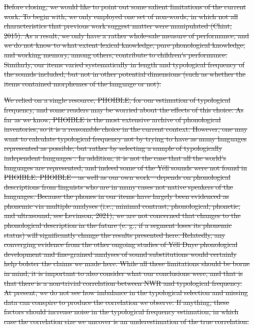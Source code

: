 \documentclass[english,,man,floatsintext]{apa6} %
\providecommand{\DIFdeltex}[1]{{\protect\color{red}\sout{#1}}}                      %
\providecommand{\DIFdelbegin}{} %
\providecommand{\DIFdel}[1]{\texorpdfstring{\DIFdeltex{#1}}{}} %
\newcommand{\DIFscaledelfig}{0.5}
\newlength{\DIFdelgraphicswidth} %
\newlength{\DIFdelgraphicsheight} %
\newcommand{\DIFdelincludegraphics}[2][]{%
	\sbox{\DIFdelgraphicsbox}{\DIFOincludegraphics[#1]{#2}}%
	\settoboxwidth{\DIFdelgraphicswidth}{\DIFdelgraphicsbox} %
	\settoboxtotalheight{\DIFdelgraphicsheight}{\DIFdelgraphicsbox} %
	\scalebox{\DIFscaledelfig}{%
		\parbox[b]{\DIFdelgraphicswidth}{\usebox{\DIFdelgraphicsbox}\\[-\baselineskip] \rule{\DIFdelgraphicswidth}{0em}}\llap{\resizebox{\DIFdelgraphicswidth}{\DIFdelgraphicsheight}{%
				\setlength{\unitlength}{\DIFdelgraphicswidth}%
				\begin{picture}(1,1)%
				\thicklines\linethickness{2pt} %
				{\color[rgb]{1,0,0}\put(0,0){\framebox(1,1){}}}%
				{\color[rgb]{1,0,0}\put(0,0){\line( 1,1){1}}}%
				{\color[rgb]{1,0,0}\put(0,1){\line(1,-1){1}}}%
				\end{picture}%
			}\hspace*{3pt}}} %
} %
\DeclareRobustCommand{\DIFdelbegin}{\DIFOdelbegin \let\includegraphics\DIFdelincludegraphics} %
\begin{document}
\DIFdelbegin %

\DIFdel{Before closing, we would like to point out some salient limitations of the current work. To begin with, we only employed one set of non-words, in which not all characteristics that previous work suggest matter were manipulated (Chiat, 2015). As a result, we only have a rather whole-sale measure of performance, and we do not know to what extent lexical knowledge, pure phonological knowledge, and working memory, among others, contribute to children's performance. Similarly, our items varied systematically in length and typological frequency of the sounds included, but not in other potential dimensions (such as whether the items contained morphemes of the language or not).
}%

\DIFdel{We relied on a single resource, PHOIBLE, for our estimation of typological frequency, and some readers may be worried about the effects of this choice. As far as we know, PHOIBLE is the most extensive archive of phonological inventories, so it is a reasonable choice in the current context. However, one may want to calculate typological frequency not by trying to have as many languages represented as possible, but rather by selecting a sample of typologically independent languages . In addition, it is not the case that all the world's languages are represented, and indeed some of the Yélî sounds were not found in PHOIBLE. PHOIBLE---as well as our own work---depends on phonological descriptions from linguists who are in many cases not native speakers of the languages. Because the phones in our items have largely been evidenced as phonemic via multiple analyses (i.e., minimal contrast, phonological, phonetic, and ultrasound, see Levinson, 2021), we are not concerned that changes to the phonological description in the future (e. g., if a segment loses its phonemic status) will significantly change the results presented here. Relatedly, any converging evidence from the other ongoing studies of Yélî Dnye phonological development and fine-grained analyses of sound substitutions would certainly help bolster the claims we made here. While all these limitations should be borne in mind, it is important to also consider what our conclusions were, and that is that there is a non-trivial correlation between NWR and typological frequency. At present, we do not see how imbalance in the typological selection and missing data can conspire to produce the correlation we observe. If anything, these factors should increase noise in the typological frequency estimation, in which case the correlation size we uncover is an underestimation of the true correlation.
}%
\end{document}
